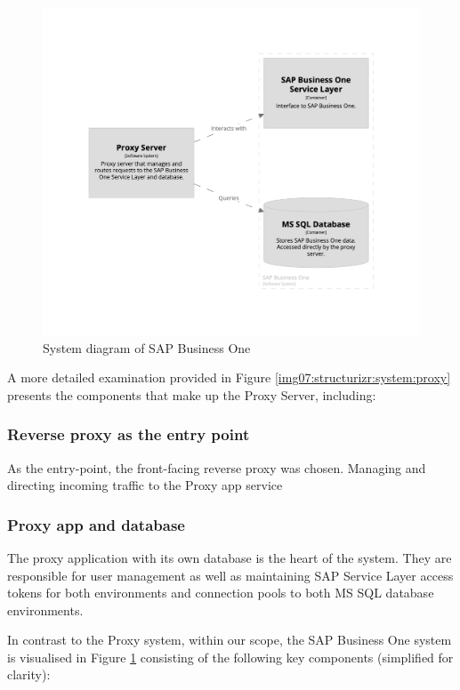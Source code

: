 \begin{figure}[p]\centering
\includegraphics[width=140mm]{img/chap07/fig_structurizr-sap-system.png}
\caption{System diagram of SAP Business One}
\label{img07:structurizr:system:sap}
\end{figure}

A more detailed examination provided in Figure \ref{img07:structurizr:system:proxy} presents the components that make up the Proxy Server, including:

\subsubsection{Reverse proxy as the entry point}
As the entry-point, the front-facing reverse proxy was chosen.
Managing and directing incoming traffic to the Proxy app service

\subsubsection{Proxy app and database}
The proxy application with its own database is the heart of the system.
They are responsible for user management as well as maintaining SAP Service Layer access tokens for both environments and connection pools to both MS SQL database environments.

In contrast to the Proxy system, within our scope, the SAP Business One system is visualised in Figure \ref{img07:structurizr:system:sap} consisting of the following key components (simplified for clarity):
 

